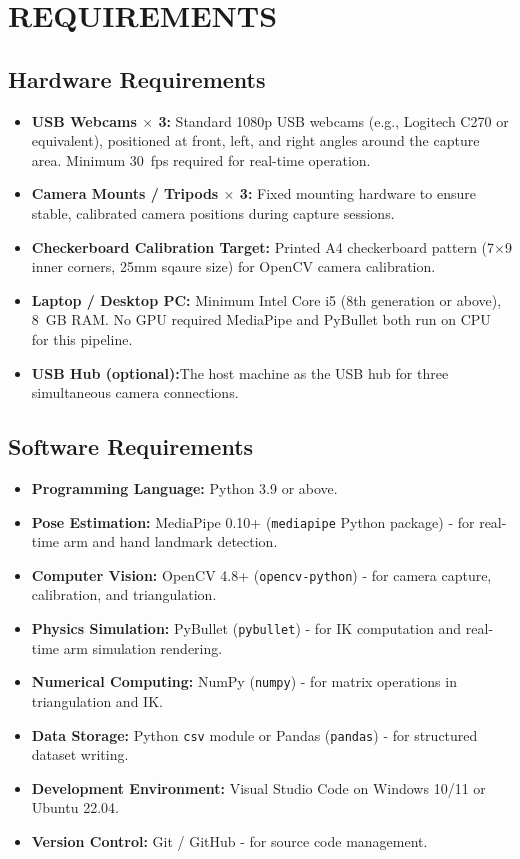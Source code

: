 \chapter{REQUIREMENTS}
\label{chap:requirements}

\section{Hardware Requirements}

\begin{itemize}[leftmargin=1.5em]
    \item \textbf{USB Webcams $\times$ 3:} Standard 1080p USB webcams (e.g., Logitech C270 or equivalent), positioned at front, left, and right angles around the capture area. Minimum 30~fps required for real-time operation.
    \item \textbf{Camera Mounts / Tripods $\times$ 3:} Fixed mounting hardware to ensure stable, calibrated camera positions during capture sessions.
    \item \textbf{Checkerboard Calibration Target:} Printed A4 checkerboard pattern (7$\times$9 inner corners, 25mm sqaure size) for OpenCV camera calibration.
    \item \textbf{Laptop / Desktop PC:} Minimum Intel Core i5 (8th generation or above), 8~GB RAM. No GPU required MediaPipe and PyBullet both run on CPU for this pipeline.
    \item \textbf{USB Hub (optional):}The host machine as the USB hub for three simultaneous camera connections.
\end{itemize}

\section{Software Requirements}

\begin{itemize}[leftmargin=1.5em]
    \item \textbf{Programming Language:} Python 3.9 or above.
    \item \textbf{Pose Estimation:} MediaPipe 0.10+ (\texttt{mediapipe} Python package) - for real-time arm and hand landmark detection.
    \item \textbf{Computer Vision:} OpenCV 4.8+ (\texttt{opencv-python}) - for camera capture, calibration, and triangulation.
    \item \textbf{Physics Simulation:} PyBullet (\texttt{pybullet}) - for IK computation and real-time arm simulation rendering.
    \item \textbf{Numerical Computing:} NumPy (\texttt{numpy}) - for matrix operations in triangulation and IK.
    \item \textbf{Data Storage:} Python \texttt{csv} module or Pandas (\texttt{pandas}) - for structured dataset writing.
    \item \textbf{Development Environment:} Visual Studio Code on Windows 10/11 or Ubuntu 22.04.
    \item \textbf{Version Control:} Git / GitHub - for source code management.
\end{itemize}

